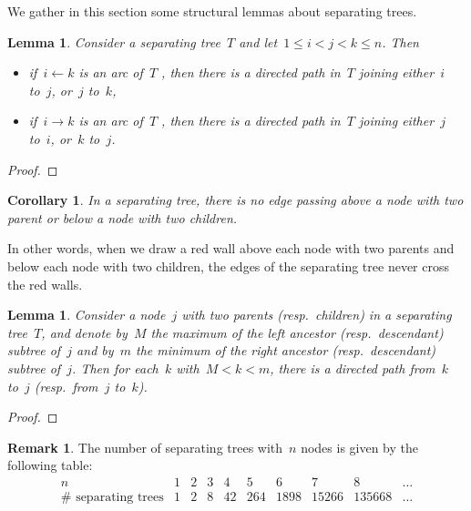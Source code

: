 \documentclass{amsart}
\newtheorem{corollary}[theorem]{Corollary}
\newtheorem{lemma}[theorem]{Lemma}
\theoremstyle{definition}
\newtheorem{remark}[theorem]{Remark}
\newcommand{\vincent}[1]{\todo[color=blue!30]{#1 \\ \hfill --- V.}}
\begin{document}
We gather in this section some structural lemmas about separating trees.

\begin{lemma}
\label{lem:separatingTree1}
Consider a separating tree~$T$ and let~$1 \le i < j < k \le n$. Then
\begin{itemize}
\item if~$i \leftarrow k$ is an arc of~$T$ , then there is a directed path in~$T$ joining either~$i$ to~$j$, or~$j$ to~$k$,
\item if~$i \to k$ is an arc of~$T$ , then there is a directed path in~$T$ joining either~$j$ to~$i$, or~$k$ to~$j$.
\end{itemize}
\end{lemma}

\begin{proof}
\vincent{todo}
\end{proof}

\begin{corollary}
\label{coro:separatingTree1}
In a separating tree, there is no edge passing above a node with two parent or below a node with two children.
\end{corollary}

In other words, when we draw a red wall above each node with two parents and below each node with two children, the edges of the separating tree never cross the red walls.

\begin{lemma}
\label{lem:separatingTree2}
Consider a node~$j$ with two parents (resp.~children) in a separating tree~$T$, and denote by~$M$ the maximum of the left ancestor (resp.~descendant) subtree of~$j$ and by~$m$ the minimum of the right ancestor (resp.~descendant) subtree of~$j$. Then for each~$k$ with~$M < k < m$, there is a directed path from~$k$ to~$j$ (resp.~from~$j$ to~$k$).
\end{lemma}

\begin{proof}
\vincent{todo}
\end{proof}

\begin{remark}
The number of separating trees with~$n$ nodes is given by the following table:
\[
\begin{array}{c|ccccccccc}
n & 1 & 2 & 3 & 4 & 5 & 6 & 7 & 8 & \dots \\
\hline
\#\text{ separating trees} & 1 & 2 & 8 & 42 & 264 & 1898 & 15266 & 135668 & \dots
\end{array}
\]
\end{remark}
\end{document}
